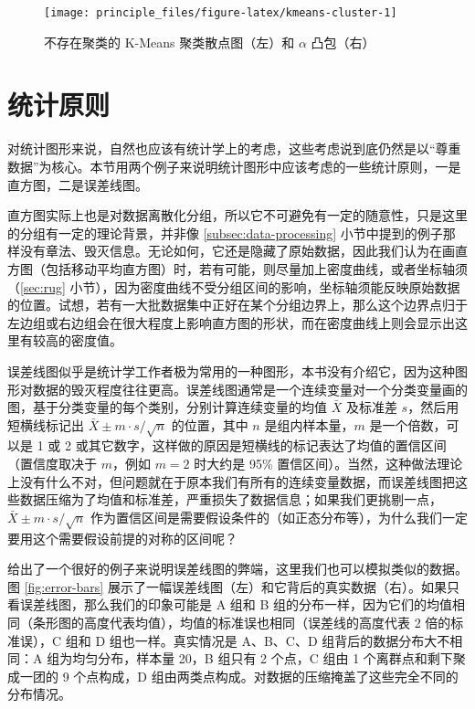 \documentclass[
  b5paper,
  UTF8,twoside]{book}
\begin{document}
\begin{figure}

{\centering \texttt{[image: principle\_files/figure-latex/kmeans-cluster-1]} 

}

\caption[不存在聚类的 K-Means 聚类散点图和 \(\alpha\) 凸包]{不存在聚类的 K-Means 聚类散点图（左）和 \(\alpha\) 凸包（右）}\label{fig:kmeans-cluster}
\end{figure}





\hypertarget{ux7edfux8ba1ux539fux5219}{%
\section{统计原则}\label{ux7edfux8ba1ux539fux5219}}

对统计图形来说，自然也应该有统计学上的考虑，这些考虑说到底仍然是以``尊重数据''为核心。本节用两个例子来说明统计图形中应该考虑的一些统计原则，一是直方图，二是误差线图。

直方图实际上也是对数据离散化分组，所以它不可避免有一定的随意性，只是这里的分组有一定的理论背景，并非像 \ref{subsec:data-processing} 小节中提到的例子那样没有章法、毁灭信息。无论如何，它还是隐藏了原始数据，因此我们认为在画直方图（包括移动平均直方图）时，若有可能，则尽量加上密度曲线，或者坐标轴须（\ref{sec:rug} 小节），因为密度曲线不受分组区间的影响，坐标轴须能反映原始数据的位置。试想，若有一大批数据集中正好在某个分组边界上，那么这个边界点归于左边组或右边组会在很大程度上影响直方图的形状，而在密度曲线上则会显示出这里有较高的密度值。

误差线图似乎是统计学工作者极为常用的一种图形，本书没有介绍它，因为这种图形对数据的毁灭程度往往更高。误差线图通常是一个连续变量对一个分类变量画的图，基于分类变量的每个类别，分别计算连续变量的均值 \(\bar{X}\) 及标准差 \(s\)，然后用短横线标记出 \(\bar{X}\pm m\cdot s/\sqrt{n}\) 的位置，其中 \(n\) 是组内样本量，\(m\) 是一个倍数，可以是 1 或 2 或其它数字，这样做的原因是短横线的标记表达了均值的置信区间（置信度取决于 \(m\)，例如 \(m=2\) 时大约是 95\% 置信区间）。当然，这种做法理论上没有什么不对，但问题就在于原本我们有所有的连续变量数据，而误差线图把这些数据压缩为了均值和标准差，严重损失了数据信息；如果我们更挑剔一点，\(\bar{X}\pm m\cdot s/\sqrt{n}\) 作为置信区间是需要假设条件的（如正态分布等），为什么我们一定要用这个需要假设前提的对称的区间呢？

\citet{Koyama10} 给出了一个很好的例子来说明误差线图的弊端，这里我们也可以模拟类似的数据。图 \ref{fig:error-bars} 展示了一幅误差线图（左）和它背后的真实数据（右）。如果只看误差线图，那么我们的印象可能是 A 组和 B 组的分布一样，因为它们的均值相同（条形图的高度代表均值），均值的标准误也相同（误差线的高度代表 2 倍的标准误），C 组和 D 组也一样。真实情况是 A、B、C、D 组背后的数据分布大不相同：A 组为均匀分布，样本量 20，B 组只有 2 个点，C 组由 1 个离群点和剩下聚成一团的 9 个点构成，D 组由两类点构成。对数据的压缩掩盖了这些完全不同的分布情况。
\end{document}
